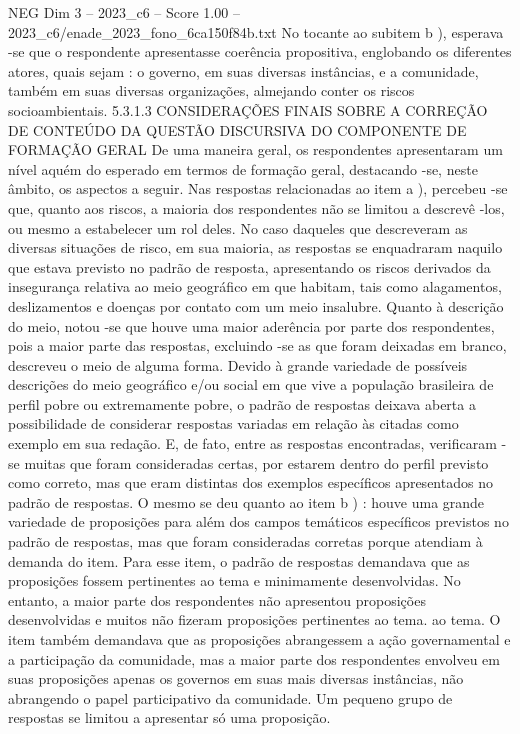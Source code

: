 \begin{textsample}{NEG Dim 3 – 2023\_c6 – Score 1.00 – 2023\_c6/enade\_2023\_fono\_6ca150f84b.txt}
No tocante ao subitem b ), esperava -se que o respondente apresentasse coerência propositiva, englobando os diferentes atores, quais sejam : o governo, em suas diversas instâncias, e a comunidade, também em suas diversas organizações, almejando conter os riscos socioambientais. 5.3.1.3 CONSIDERAÇÕES FINAIS SOBRE A CORREÇÃO DE CONTEÚDO DA QUESTÃO DISCURSIVA DO COMPONENTE DE FORMAÇÃO GERAL De uma maneira geral, os respondentes apresentaram um nível aquém do esperado em termos de formação geral, destacando -se, neste âmbito, os aspectos a seguir.
Nas respostas relacionadas ao item a ), percebeu -se que, quanto aos riscos, a maioria dos respondentes não se limitou a descrevê -los, ou mesmo a estabelecer um rol deles.
No caso daqueles que descreveram as diversas situações de risco, em sua maioria, as respostas se enquadraram naquilo que estava previsto no padrão de resposta, apresentando os riscos derivados da insegurança relativa ao meio geográfico em que habitam, tais como alagamentos, deslizamentos e doenças por contato com um meio insalubre.
Quanto à descrição do meio, notou -se que houve uma maior aderência por parte dos respondentes, pois a maior parte das respostas, excluindo -se as que foram deixadas em branco, descreveu o meio de alguma forma.
Devido à grande variedade de possíveis descrições do meio geográfico e/ou social em que vive a população brasileira de perfil pobre ou extremamente pobre, o padrão de respostas deixava aberta a possibilidade de considerar respostas variadas em relação às citadas como exemplo em sua redação.
E, de fato, entre as respostas encontradas, verificaram -se muitas que foram consideradas certas, por estarem dentro do perfil previsto como correto, mas que eram distintas dos exemplos específicos apresentados no padrão de respostas.
O mesmo se deu quanto ao item b ) : houve uma grande variedade de proposições para além dos campos temáticos específicos previstos no padrão de respostas, mas que foram consideradas corretas porque atendiam à demanda do item.
Para esse item, o padrão de respostas demandava que as proposições fossem pertinentes ao tema e minimamente desenvolvidas.
No entanto, a maior parte dos respondentes não apresentou proposições desenvolvidas e muitos não fizeram proposições pertinentes ao tema. ao tema.
O item também demandava que as proposições abrangessem a ação governamental e a participação da comunidade, mas a maior parte dos respondentes envolveu em suas proposições apenas os governos em suas mais diversas instâncias, não abrangendo o papel participativo da comunidade.
Um pequeno grupo de respostas se limitou a apresentar só uma proposição.

\end{textsample}
